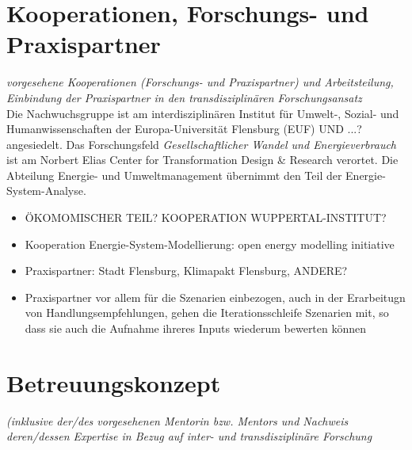\documentclass[a4paper,11pt,twoside]{scrartcl}
\begin{document}
\section{Kooperationen, Forschungs- und Praxispartner}
\textit{vorgesehene Kooperationen (Forschungs- und Praxispartner) und Arbeitsteilung, Einbindung der Praxispartner in den transdisziplinären Forschungsansatz}\\
Die Nachwuchsgruppe ist am interdisziplinären Institut für Umwelt-, Sozial- und Humanwissenschaften der Europa-Universität Flensburg (EUF) UND ...? angesiedelt. Das Forschungsfeld \textit{Gesellschaftlicher Wandel und Energieverbrauch} ist am Norbert Elias Center for Transformation Design & Research verortet. Die Abteilung Energie- und Umweltmanagement übernimmt den Teil der Energie-System-Analyse.
\begin{itemize}
 \item ÖKOMOMISCHER TEIL? KOOPERATION WUPPERTAL-INSTITUT?
 \item Kooperation Energie-System-Modellierung: open energy modelling initiative
 \item Praxispartner: Stadt Flensburg, Klimapakt Flensburg, ANDERE?
 \item Praxispartner vor allem für die Szenarien einbezogen, auch in der Erarbeitugn von Handlungsempfehlungen, gehen die Iterationsschleife Szenarien mit, so dass sie auch die Aufnahme ihreres Inputs wiederum bewerten können
\end{itemize}

\section{Betreuungskonzept}
\textit{(inklusive der/des vorgesehenen Mentorin bzw. Mentors und Nachweis deren/dessen Expertise in Bezug auf inter- und transdisziplinäre Forschung}


\end{document}

